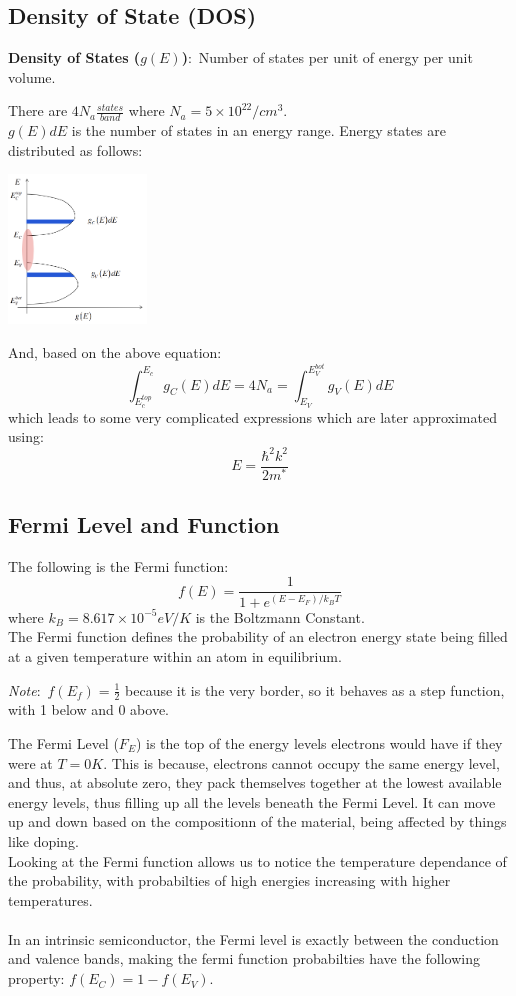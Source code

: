\documentclass[nobib]{tufte-handout}
\newcommand{\defn}[2]{
        \begin{defbox}
        \noindent\textbf{#1}:\ #2
        \end{defbox}
}
\newcommand{\note}[1]{
        \begin{notebox}
        \noindent\textit{Note}:\ #1
        \end{notebox}
}
\begin{document}
\subsection{Density of State (DOS)}
\defn{Density of States ($g(E)$)}{Number of states per unit of energy per unit volume.}
There are $4N_a \frac{states}{band}$ where $N_a = 5\times 10^{22}/cm^3$.\\
$g(E)dE$ is the number of states in an energy range.
Energy states are distributed as follows:
\begin{center}
    \includegraphics*[height = 150px]{images/dos.png}
\end{center}
And, based on the above equation:
\begin{equation*}
    \int_{E_c^{top}}^{E_c} g_C(E)dE = 4N_a = \int_{E_V}^{E_V^{bot}} g_V(E)dE
\end{equation*}
which leads to some very complicated expressions which are later approximated using:
\begin{equation*}
    E = \frac{\hbar^2k^2}{2m^*}
\end{equation*}
\subsection{Fermi Level and Function}
The following is the Fermi function:
\begin{equation*}
    f(E) = \frac{1}{1+e^{(E-E_F)/k_B T}}
\end{equation*}
where $k_B = 8.617\times 10^{-5} eV/K$ is the Boltzmann Constant.\\
The Fermi function defines the probability of an electron energy state being filled at a given temperature within an atom in equilibrium.
\note{$f(E_f) = \frac{1}{2}$ because it is the very border, so it behaves as a step function, with 1 below and 0 above.}
The Fermi Level ($F_E$) is the top of the energy levels electrons would have if they were at $T=0K$. This is because, electrons cannot occupy the same energy level, and thus, at absolute zero, they pack themselves together at the lowest available energy levels, thus filling up all the levels beneath the Fermi Level.
It can move up and down based on the compositionn of the material, being affected by things like doping.\\
Looking at the Fermi function allows us to notice the temperature dependance of the probability, with probabilties of high energies increasing with higher temperatures.\\~\\
In an intrinsic semiconductor, the Fermi level is exactly between the conduction and valence bands, making the fermi function probabilties have the following property: $f(E_C) = 1-f(E_V)$.
\end{document}
